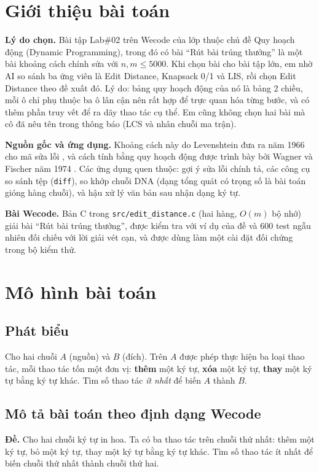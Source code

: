 \documentclass[12pt,a4paper]{article}
\newcommand{\code}[1]{\texttt{#1}}
\begin{document}
\section{Giới thiệu bài toán}

\textbf{Lý do chọn.} Bài tập Lab\#02 trên Wecode của lớp thuộc chủ đề Quy hoạch động (Dynamic Programming), trong đó có bài ``Rút bài trúng thưởng'' là một bài khoảng cách chỉnh sửa với $n,m\le 5000$. Khi chọn bài cho bài tập lớn, em nhờ AI so sánh ba ứng viên là Edit Distance, Knapsack 0/1 và LIS, rồi chọn Edit Distance theo đề xuất đó. Lý do: bảng quy hoạch động của nó là bảng 2 chiều, mỗi ô chỉ phụ thuộc ba ô lân cận nên rất hợp để trực quan hóa từng bước, và có thêm phần truy vết để ra dãy thao tác cụ thể. Em cũng không chọn hai bài mà cô đã nêu tên trong thông báo (LCS và nhân chuỗi ma trận).

\textbf{Nguồn gốc và ứng dụng.} Khoảng cách này do Levenshtein đưa ra năm 1966 cho mã sửa lỗi \cite{levenshtein}, và cách tính bằng quy hoạch động được trình bày bởi Wagner và Fischer năm 1974 \cite{wagner}. Các ứng dụng quen thuộc: gợi ý sửa lỗi chính tả, các công cụ so sánh tệp (\code{diff}), so khớp chuỗi DNA (dạng tổng quát có trọng số là bài toán gióng hàng chuỗi), và hậu xử lý văn bản sau nhận dạng ký tự.

\textbf{Bài Wecode.} Bản C trong \code{src/edit\_distance.c} (hai hàng, $O(m)$ bộ nhớ) giải bài ``Rút bài trúng thưởng'', được kiểm tra với ví dụ của đề và 600 test ngẫu nhiên đối chiếu với lời giải vét cạn, và được dùng làm một cài đặt đối chứng trong bộ kiểm thử.

\section{Mô hình bài toán}
\subsection{Phát biểu}
Cho hai chuỗi $A$ (nguồn) và $B$ (đích). Trên $A$ được phép thực hiện ba loại thao tác, mỗi thao tác tốn một đơn vị: \textbf{thêm} một ký tự, \textbf{xóa} một ký tự, \textbf{thay} một ký tự bằng ký tự khác. Tìm số thao tác \emph{ít nhất} để biến $A$ thành $B$.

\subsection{Mô tả bài toán theo định dạng Wecode}
\textbf{Đề.} Cho hai chuỗi ký tự in hoa. Ta có ba thao tác trên chuỗi thứ nhất: thêm một ký tự, bỏ một ký tự, thay một ký tự bằng ký tự khác. Tìm số thao tác ít nhất để biến chuỗi thứ nhất thành chuỗi thứ hai.
\end{document}
